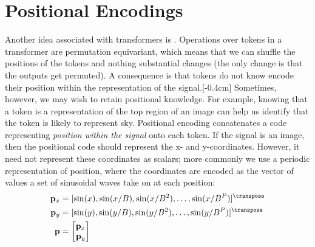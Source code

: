 



\section{Positional Encodings}\label{sec:transformers:positional_encodings}
Another idea associated with transformers is . Operations over tokens in a transformer are permutation equivariant, which means that we can shuffle the positions of the tokens and nothing substantial changes (the only change is that the outputs get permuted). A consequence is that tokens do not know encode their position within the representation of the signal.[-0.4cm] Sometimes, however, we may wish to retain positional knowledge. For example, knowing that a token is a representation of the top region of an image can help us identify that the token is likely to represent sky. Positional encoding concatenates a code representing \textit{position within the signal} onto each token. If the signal is an image, then the positional code should represent the x- and y-coordinates. However, it need not represent these coordinates as scalars; more commonly we use a periodic representation of position, where the coordinates are encoded as the vector of values a set of sinusoidal waves take on at each position:
\begin{align}
    \mathbf{p}_x &= [\sin(x), \sin(x/B), \sin(x/B^2), \ldots, \sin(x/B^P)]^\transpose\\
    \mathbf{p}_y &= [\sin(y), \sin(y/B), \sin(y/B^2), \ldots, \sin(y/B^P)]^\transpose\\
    \mathbf{p} &= \begin{bmatrix}
        \mathbf{p}_x\\
        \mathbf{p}_y
    \end{bmatrix}
\end{align}
